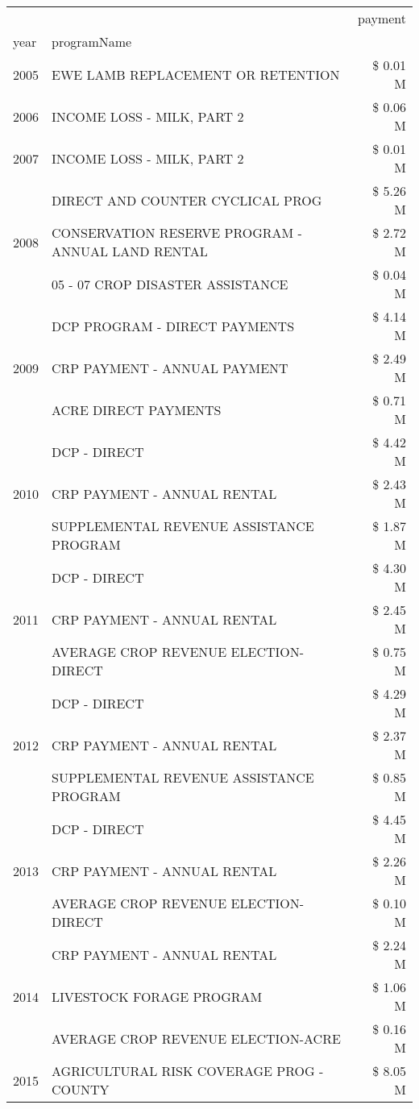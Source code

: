 \begin{tabular}{llr}
\toprule
 &  & payment \\
year & programName &  \\
\midrule
2005 & EWE LAMB REPLACEMENT OR RETENTION & \$ 0.01 M \\
\cline{1-3}
2006 & INCOME LOSS - MILK, PART 2 & \$ 0.06 M \\
\cline{1-3}
2007 & INCOME LOSS - MILK, PART 2 & \$ 0.01 M \\
\cline{1-3}
\multirow[t]{3}{*}{2008} & DIRECT AND COUNTER CYCLICAL PROG & \$ 5.26 M \\
 & CONSERVATION RESERVE PROGRAM - ANNUAL LAND RENTAL & \$ 2.72 M \\
 & 05 - 07 CROP DISASTER ASSISTANCE & \$ 0.04 M \\
\cline{1-3}
\multirow[t]{3}{*}{2009} & DCP PROGRAM - DIRECT PAYMENTS & \$ 4.14 M \\
 & CRP PAYMENT - ANNUAL PAYMENT & \$ 2.49 M \\
 & ACRE DIRECT PAYMENTS & \$ 0.71 M \\
\cline{1-3}
\multirow[t]{3}{*}{2010} & DCP - DIRECT & \$ 4.42 M \\
 & CRP PAYMENT - ANNUAL RENTAL & \$ 2.43 M \\
 & SUPPLEMENTAL REVENUE ASSISTANCE PROGRAM & \$ 1.87 M \\
\cline{1-3}
\multirow[t]{3}{*}{2011} & DCP - DIRECT & \$ 4.30 M \\
 & CRP PAYMENT - ANNUAL RENTAL & \$ 2.45 M \\
 & AVERAGE CROP REVENUE ELECTION-DIRECT & \$ 0.75 M \\
\cline{1-3}
\multirow[t]{3}{*}{2012} & DCP - DIRECT & \$ 4.29 M \\
 & CRP PAYMENT - ANNUAL RENTAL & \$ 2.37 M \\
 & SUPPLEMENTAL REVENUE ASSISTANCE PROGRAM & \$ 0.85 M \\
\cline{1-3}
\multirow[t]{3}{*}{2013} & DCP - DIRECT & \$ 4.45 M \\
 & CRP PAYMENT - ANNUAL RENTAL & \$ 2.26 M \\
 & AVERAGE CROP REVENUE ELECTION-DIRECT & \$ 0.10 M \\
\cline{1-3}
\multirow[t]{3}{*}{2014} & CRP PAYMENT - ANNUAL RENTAL & \$ 2.24 M \\
 & LIVESTOCK FORAGE PROGRAM & \$ 1.06 M \\
 & AVERAGE CROP REVENUE ELECTION-ACRE & \$ 0.16 M \\
\cline{1-3}
\multirow[t]{3}{*}{2015} & AGRICULTURAL RISK COVERAGE PROG - COUNTY & \$ 8.05 M \\

\end{tabular}
